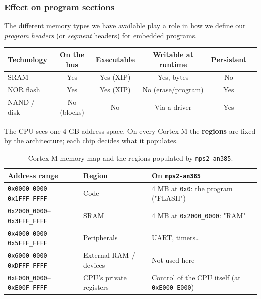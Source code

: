 \documentclass[a4paper,11pt]{article}
\begin{document}
\subsubsection{Effect on program sections}

The different memory types we have available play a role in how we define our \textit{program headers} (or \textit{segment} headers) for embedded programs.

\begin{table}[ht]
	\centering
	\begin{tabular}{lccccc}
		\hline
		Technology  & On the bus  & Executable & Writable at runtime & Persistent \\
		\hline
		SRAM        & Yes         & Yes (XIP)  & Yes, bytes          & No         \\
		NOR flash   & Yes         & Yes (XIP)  & No (erase/program)  & Yes        \\
		NAND / disk & No (blocks) & No         & Via a driver        & Yes        \\
		\hline
	\end{tabular}
\end{table}

The CPU sees one 4 GB address space. On every Cortex-M the \textbf{regions} are fixed by the architecture; each chip decides what it populates.

\begin{table}[ht]
	\centering
	\begin{tabular}{llp{5cm}}
		\hline
		Address range & Region                                               & On \texttt{mps2-an385} \\
		\hline
		\texttt{0x0000\_0000}--\texttt{0x1FFF\_FFFF}
		              & Code
		              & 4 MB at \texttt{0x0}: the program ("FLASH")                                   \\

		\texttt{0x2000\_0000}--\texttt{0x3FFF\_FFFF}
		              & SRAM
		              & 4 MB at \texttt{0x2000\_0000}: "RAM"                                          \\

		\texttt{0x4000\_0000}--\texttt{0x5FFF\_FFFF}
		              & Peripherals
		              & UART, timers\ldots                                                            \\

		\texttt{0x6000\_0000}--\texttt{0xDFFF\_FFFF}
		              & External RAM / devices
		              & Not used here                                                                 \\

		\texttt{0xE000\_0000}--\texttt{0xE00F\_FFFF}
		              & CPU's private registers
		              & Control of the CPU itself (at \texttt{0xE000\_E000})                          \\
		\hline
	\end{tabular}
	\caption{Cortex-M memory map and the regions populated by \texttt{mps2-an385}.}
	\label{tab:cortex-m-memory-map}
\end{table}
\end{document}
